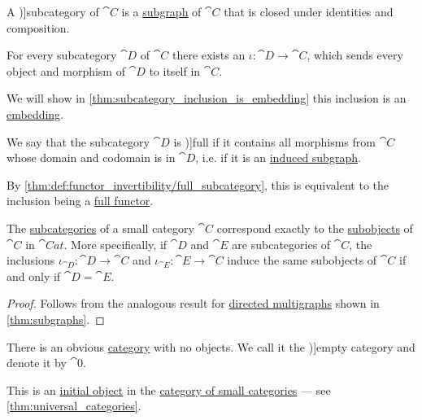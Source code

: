 \begin{definition}\label{def:subcategory}
  A \term[ru=подкатегория (\cite[15]{ЦаленкоШульгейфер1974ОсновыТеорииКатегорий})]{subcategory} of \( \cat{C} \) is a \hyperref[def:directed_multigraph/subobject]{subgraph} of \( \cat{C} \) that is closed under identities and composition.

  \begin{thmenum}
     For every subcategory \( \cat{D} \) of \( \cat{C} \) there exists an  \( \iota: \cat{D} \to \cat{C} \), which sends every object and morphism of \( \cat{D} \) to itself in \( \cat{C} \).

    We will show in \cref{thm:subcategory_inclusion_is_embedding} this inclusion is an \hyperref[def:functor_invertibility/injective]{embedding}.

     We say that the subcategory \( \cat{D} \) is \term[ru=полная (подкатегория) (\cite[15]{ЦаленкоШульгейфер1974ОсновыТеорииКатегорий})]{full} if it contains all morphisms from \( \cat{C} \) whose domain and codomain is in \( \cat{D} \), i.e. if it is an \hyperref[def:induced_subgraph]{induced subgraph}.

    By \cref{thm:def:functor_invertibility/full_subcategory}, this is equivalent to the inclusion being a \hyperref[def:functor_invertibility/full]{full functor}.
  \end{thmenum}
\end{definition}

\begin{proposition}\label{thm:subcategories_and_subobjects}
  The \hyperref[def:subcategory]{subcategories} of a small category \( \cat{C} \) correspond exactly to the \hyperref[def:categorical_subobject]{subobjects} of \( \cat{C} \) in \( \cat{Cat} \). More specifically, if \( \cat{D} \) and \( \cat{E} \) are subcategories of \( \cat{C} \), the inclusions \( \iota_{\cat{D}}: \cat{D} \to \cat{C} \) and \( \iota_{\cat{E}}: \cat{E} \to \cat{C} \) induce the same subobjects of \( \cat{C} \) if and only if \( \cat{D} = \cat{E} \).
\end{proposition}
\begin{proof}
  Follows from the analogous result for \hyperref[def:directed_multigraph]{directed multigraphs} shown in \cref{thm:subgraphs}.
\end{proof}

\begin{definition}\label{def:empty_category}
  There is an obvious \hyperref[def:category]{category} with no objects. We call it the \term[ru=пустая категория (\cite[16]{ЦаленкоШульгейфер1974ОсновыТеорииКатегорий})]{empty category} and denote it by \( \cat{0} \).
\end{definition}
\begin{comments}
  \item This is an \hyperref[def:universal_objects/initial]{initial object} in the \hyperref[def:category_of_small_categories]{category of small categories} --- see \cref{thm:universal_categories}.
\end{comments}

